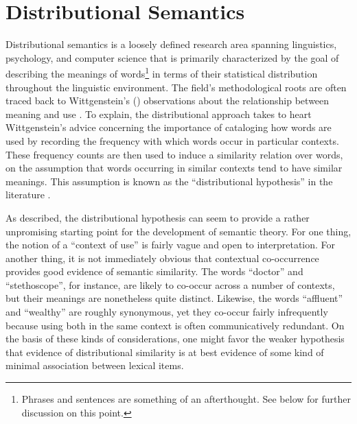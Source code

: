 \section{Distributional Semantics}

Distributional semantics is a loosely defined research area spanning linguistics, psychology, and computer science that is primarily characterized by the goal of describing the meanings of words\footnote{Phrases and sentences are something of an afterthought. See below for further discussion on this point.} in terms of their statistical distribution throughout the linguistic environment. The field's methodological roots are often traced back to Wittgenstein's (\citeyear{Wittgenstein:1953}) observations about the relationship between meaning and use \citep{Baroni:2014,TurneyPantel:2010}. To explain, the distributional approach takes to heart Wittgenstein's advice concerning the importance of cataloging how words are used by recording the frequency with which words occur in particular contexts. These frequency counts are then used to induce a similarity relation over words, on the assumption that words occurring in similar contexts tend to have similar meanings. This assumption is known as the ``distributional hypothesis'' in the literature \citep{Baroni:2014,TurneyPantel:2010,Sahlgren:2005}.

As described, the distributional hypothesis can seem to provide a rather unpromising starting point for the development of semantic theory. For one thing, the notion of a ``context of use'' is fairly vague and open to interpretation. For another thing, it is not immediately obvious that contextual co-occurrence provides good evidence of semantic similarity. The words ``doctor'' and ``stethoscope'', for instance, are likely to co-occur across a number of contexts, but their meanings are nonetheless quite distinct. Likewise, the words ``affluent'' and ``wealthy'' are roughly synonymous, yet they co-occur fairly infrequently because using both in the same context is often communicatively redundant. On the basis of these kinds of considerations, one might favor the weaker hypothesis that evidence of distributional similarity is at best evidence of some kind of minimal association between lexical items. 

